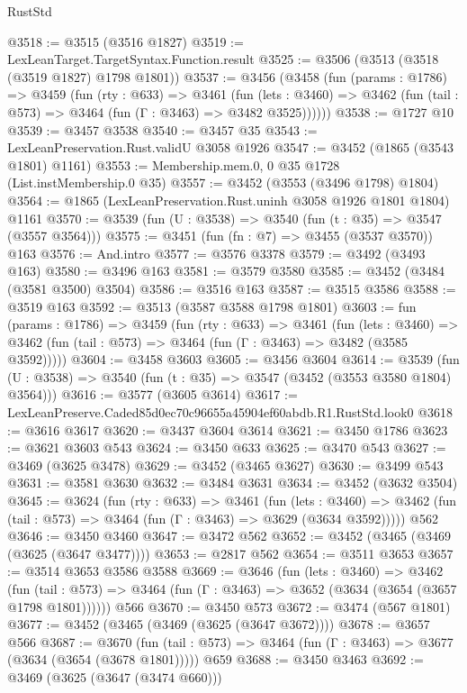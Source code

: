 \begin{lexlean}{RustStd}
\begin{coremodule}
@3518 := @3515 (@3516 @1827)
@3519 := LexLeanTarget.TargetSyntax.Function.result
@3525 := @3506 (@3513 (@3518 (@3519 @1827) @1798 @1801))
@3537 := @3456
    (@3458
      (fun (params : @1786) =>
      @3459
        (fun (rty : @633) =>
        @3461
          (fun (lets : @3460) =>
          @3462 (fun (tail : @573) => @3464 (fun (Γ : @3463) => @3482 @3525))))))
@3538 := @1727 @10
@3539 := @3457 @3538
@3540 := @3457 @35
@3543 := LexLeanPreservation.Rust.validU @3058 @1926
@3547 := @3452 (@1865 (@3543 @1801) @1161)
@3553 := Membership.mem.{0, 0} @35 @1728 (List.instMembership.{0} @35)
@3557 := @3452 (@3553 (@3496 @1798) @1804)
@3564 := @1865 (LexLeanPreservation.Rust.uninh @3058 @1926 @1801 @1804) @1161
@3570 := @3539 (fun (U : @3538) => @3540 (fun (t : @35) => @3547 (@3557 @3564)))
@3575 := @3451 (fun (fn : @7) => @3455 (@3537 @3570)) @163
@3576 := And.intro
@3577 := @3576 @3378
@3579 := @3492 (@3493 @163)
@3580 := @3496 @163
@3581 := @3579 @3580
@3585 := @3452 (@3484 (@3581 @3500) @3504)
@3586 := @3516 @163
@3587 := @3515 @3586
@3588 := @3519 @163
@3592 := @3513 (@3587 @3588 @1798 @1801)
@3603 := fun (params : @1786) =>
  @3459
    (fun (rty : @633) =>
    @3461
      (fun (lets : @3460) =>
      @3462 (fun (tail : @573) => @3464 (fun (Γ : @3463) => @3482 (@3585 @3592)))))
@3604 := @3458 @3603
@3605 := @3456 @3604
@3614 := @3539 (fun (U : @3538) => @3540 (fun (t : @35) => @3547 (@3452 (@3553 @3580 @1804) @3564)))
@3616 := @3577 (@3605 @3614)
@3617 := LexLeanPreserve.Caded85d0ec70c96655a45904ef60abdb.R1.RustStd.look0
@3618 := @3616 @3617
@3620 := @3437 @3604 @3614
@3621 := @3450 @1786
@3623 := @3621 @3603 @543
@3624 := @3450 @633
@3625 := @3470 @543
@3627 := @3469 (@3625 @3478)
@3629 := @3452 (@3465 @3627)
@3630 := @3499 @543
@3631 := @3581 @3630
@3632 := @3484 @3631
@3634 := @3452 (@3632 @3504)
@3645 := @3624
    (fun (rty : @633) =>
    @3461
      (fun (lets : @3460) =>
      @3462 (fun (tail : @573) => @3464 (fun (Γ : @3463) => @3629 (@3634 @3592)))))
    @562
@3646 := @3450 @3460
@3647 := @3472 @562
@3652 := @3452 (@3465 (@3469 (@3625 (@3647 @3477))))
@3653 := @2817 @562
@3654 := @3511 @3653
@3657 := @3514 @3653 @3586 @3588
@3669 := @3646
    (fun (lets : @3460) =>
    @3462
      (fun (tail : @573) => @3464 (fun (Γ : @3463) => @3652 (@3634 (@3654 (@3657 @1798 @1801))))))
    @566
@3670 := @3450 @573
@3672 := @3474 (@567 @1801)
@3677 := @3452 (@3465 (@3469 (@3625 (@3647 @3672))))
@3678 := @3657 @566
@3687 := @3670
    (fun (tail : @573) => @3464 (fun (Γ : @3463) => @3677 (@3634 (@3654 (@3678 @1801)))))
    @659
@3688 := @3450 @3463
@3692 := @3469 (@3625 (@3647 (@3474 @660)))

\end{coremodule}
\end{lexlean}
